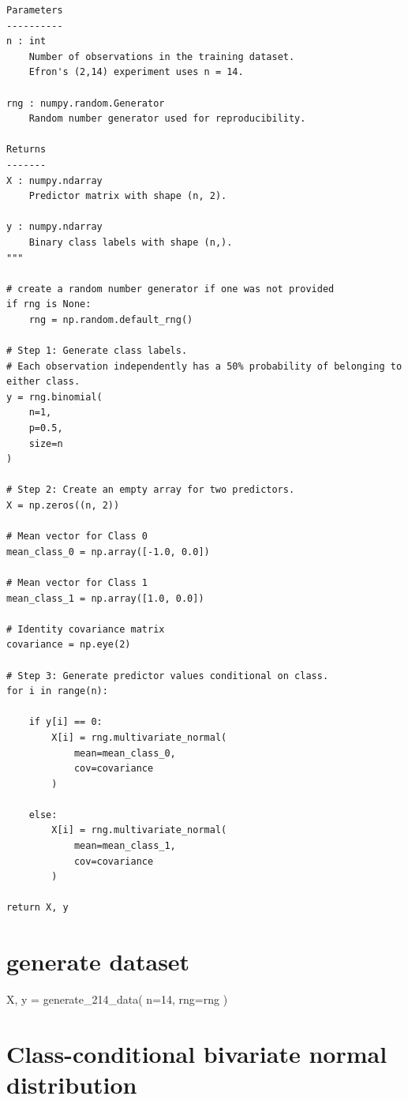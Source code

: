\documentclass[
  letterpaper,
  DIV=11,
  numbers=noendperiod]{scrreprt}
\begin{document}
\begin{verbatim}
Parameters
----------
n : int
    Number of observations in the training dataset.
    Efron's (2,14) experiment uses n = 14.

rng : numpy.random.Generator
    Random number generator used for reproducibility.

Returns
-------
X : numpy.ndarray
    Predictor matrix with shape (n, 2).

y : numpy.ndarray
    Binary class labels with shape (n,).
"""

# create a random number generator if one was not provided
if rng is None:
    rng = np.random.default_rng()

# Step 1: Generate class labels.
# Each observation independently has a 50% probability of belonging to either class.
y = rng.binomial(
    n=1,
    p=0.5,
    size=n
)

# Step 2: Create an empty array for two predictors.
X = np.zeros((n, 2))

# Mean vector for Class 0
mean_class_0 = np.array([-1.0, 0.0])

# Mean vector for Class 1
mean_class_1 = np.array([1.0, 0.0])

# Identity covariance matrix
covariance = np.eye(2)

# Step 3: Generate predictor values conditional on class.
for i in range(n):

    if y[i] == 0:
        X[i] = rng.multivariate_normal(
            mean=mean_class_0,
            cov=covariance
        )

    else:
        X[i] = rng.multivariate_normal(
            mean=mean_class_1,
            cov=covariance
        )

return X, y
\end{verbatim}


\chapter{generate dataset}\label{generate-dataset}

X, y = generate\_214\_data( n=14, rng=rng )


\chapter{Class-conditional bivariate normal
distribution}\label{class-conditional-bivariate-normal-distribution}
\end{document}
